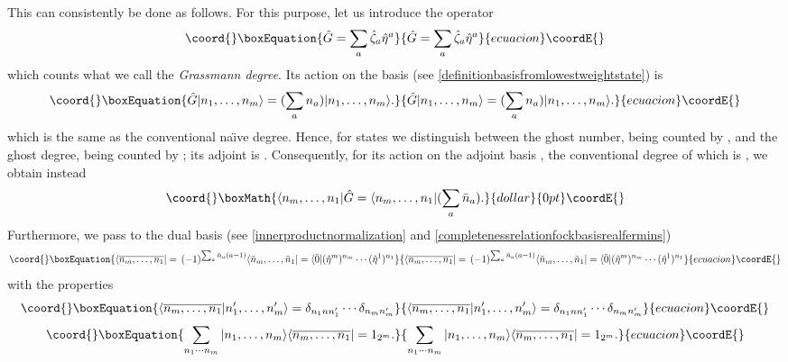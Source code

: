 \documentclass[a4paper,10pt]{article}
\begin{document}
This can consistently be done as follows. For this purpose, let us introduce the operator
\begin{equation}\coord{}\boxEquation{
\hat{G}=\sum_a\hat{\zeta}_a\hat{\eta}^a
}{
\hat{G}=\sum_a\hat{\zeta}_a\hat{\eta}^a
}{ecuacion}\coordE{}\end{equation}
which counts what we call the \emph{Grassmann degree}. Its action on the basis (see 
\eqref{definitionbasisfromlowestweightstate}) is 
\begin{equation}\coord{}\boxEquation{
\hat{G}|n_1,\ldots,n_m\rangle=(\sum_an_a)|n_1,\ldots,n_m\rangle.
}{
\hat{G}|n_1,\ldots,n_m\rangle=(\sum_an_a)|n_1,\ldots,n_m\rangle.
}{ecuacion}\coordE{}\end{equation}
which is the same as the conventional na\"\i ve degree. Hence, for states we distinguish 
between the ghost number, being counted by \coordHE{}, and the ghost degree, being counted 
by \coordHE{}; its adjoint is \coordHE{}. Consequently, for its action on 
the adjoint basis  \coordHE{}, the 
conventional degree of which is \coordHE{}, we obtain instead 
$$\coord{}\boxMath{\langle n_m,\ldots,n_1|\hat{G}=\langle n_m,\ldots,n_1|(\sum_a\bar{n}_a).}{dollar}{0pt}\coordE{}$$
Furthermore, we pass to the dual basis (see \eqref{innerproductnormalization} and 
\eqref{completenessrelationfockbasisrealfermins})
\begin{equation}\coord{}\boxEquation{
\langle\overline{n_m,\ldots,n_1}|=\,(-1)^{\sum_{a}\bar{n}_a(a-
1)}\langle\bar{n}_m,\ldots,\bar{n}_1|=\langle\bar{0}|(\hat{\eta}^m)^{n_m}\cdots
(\hat{\eta}^1)^{n_1}
}{
\langle\overline{n_m,\ldots,n_1}|=\,(-1)^{\sum_{a}\bar{n}_a(a-
1)}\langle\bar{n}_m,\ldots,\bar{n}_1|=\langle\bar{0}|(\hat{\eta}^m)^{n_m}\cdots
(\hat{\eta}^1)^{n_1}
}{ecuacion}\coordE{}\end{equation}
with the properties 
\begin{equation}\coord{}\boxEquation{
\langle\overline{n_m,\ldots,n_1}|n^{\prime}_1,\ldots,n^{\prime}_m\rangle=\delta_
{n_1nn^{\prime}_1}\cdots\delta_{n_mn^{\prime}_m}
}{
\langle\overline{n_m,\ldots,n_1}|n^{\prime}_1,\ldots,n^{\prime}_m\rangle=\delta_
{n_1nn^{\prime}_1}\cdots\delta_{n_mn^{\prime}_m}
}{ecuacion}\coordE{}\end{equation}
\begin{equation}\coord{}\boxEquation{
\sum_{n_1\cdots n_m}|n_1,\ldots,n_m\rangle\langle\overline{n_m,\ldots,n_1}|=1_{2^m}.
}{
\sum_{n_1\cdots n_m}|n_1,\ldots,n_m\rangle\langle\overline{n_m,\ldots,n_1}|=1_{2^m}.
}{ecuacion}\coordE{}\end{equation}
\end{document}
